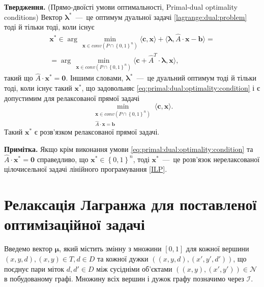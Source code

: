 \textbf{Твердження.}
(Прямо-двоїсті умови оптимальності, Primal-dual optimality conditions)
Вектор $\pmb{\lambda}^*$~---~це оптимум дуальної задачі
\eqref{lagrange:dual:problem} тоді й тільки тоді, коли існує
\begin{equation} \label{eq:primal:dual:optimality:condition}
\begin{gathered}
    \pmb{x}^* \in
    \arg\,\min \limits_{\pmb{x} \in conv \left( P \cap \left\{ 0, 1\right\}^n\right)}
        \langle \pmb{c}, \pmb{x} \rangle +
        \langle \pmb{\lambda}, \hat{A} \cdot \pmb{x} - \pmb{b} \rangle = \\
    = \arg\,\min \limits_{\pmb{x} \in conv \left( P \cap \left\{ 0, 1\right\}^n\right)}
        \langle \pmb{c} + \hat{A}^T \cdot \pmb{\lambda}, \pmb{x} \rangle,
\end{gathered}
\end{equation}
такий що $\hat{A} \cdot \pmb{x}^* = \pmb{0}$.
Іншими словами, $\pmb{\lambda}^*$~---~це дуальний оптимум тоді й тільки тоді,
коли існує такий $\pmb{x}^*$,
що задовольняє \eqref{eq:primal:dual:optimality:condition}
і є допустимим для релаксованої прямої задачі
\begin{equation*}
    \min \limits_{\substack{\pmb{x} \in conv \left( P \cap \left\{ 0, 1 \right\}^n\right) \\
                            \hat{A} \cdot \pmb{x} = \pmb{b}}}
        \langle \pmb{c}, \pmb{x} \rangle.
\end{equation*}
Такий $\pmb{x}^*$ є розв'язком релаксованої прямої задачі.

\textbf{Примітка.}
Якщо крім виконання умови \eqref{eq:primal:dual:optimality:condition} та
$\hat{A} \cdot \pmb{x}^* = \pmb{0}$ справедливо,
що $\pmb{x}^* \in \left\{ 0, 1 \right\}^n$,
тоді $\pmb{x}^*$~---~це розв'язок нерелаксованої
цілочисельної задачі лінійного програмування \eqref{ILP}.

\section{Релаксація Лагранжа для поставленої оптимізаційної задачі}

Введемо вектор $\pmb{\mu}$, який містить змінну з множини $ \left[ 0, 1 \right]$
для кожної вершини
$\left( x, y, d \right), \left(x, y \right) \in T, d \in D$ та кожної дужки
$\left( \left( x, y, d \right), \left(x', y', d' \right) \right)$,
що поєднує пари міток $d, d' \in D$ між сусідніми об'єктами
$\left(\left(x, y \right), \left(x', y' \right) \right) \in \mathcal{N}$
в побудованому графі.
Множину всіх вершин і дужок графу позначимо через $\mathcal{I}$.

